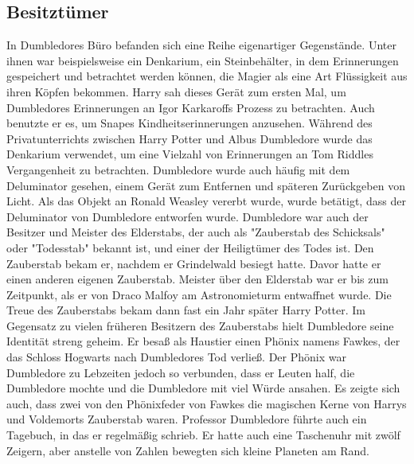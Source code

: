 \documentclass[a4paper, 10pt]{article}
\begin{document}
\subsection*{\Large Besitztümer}
In Dumbledores Büro befanden sich eine Reihe eigenartiger Gegenstände. Unter ihnen war beispielsweise ein Denkarium, ein Steinbehälter, in dem Erinnerungen gespeichert und betrachtet werden können, die Magier als eine Art Flüssigkeit aus ihren Köpfen bekommen. Harry sah dieses Gerät zum ersten Mal, um Dumbledores Erinnerungen an Igor Karkaroffs Prozess zu betrachten. Auch benutzte er es, um Snapes Kindheitserinnerungen anzusehen. Während des Privatunterrichts zwischen Harry Potter und Albus Dumbledore wurde das Denkarium verwendet, um eine Vielzahl von Erinnerungen an Tom Riddles Vergangenheit zu betrachten.
\vspace{10pt}
\newline
Dumbledore wurde auch häufig mit dem Deluminator gesehen, einem Gerät zum Entfernen und späteren Zurückgeben von Licht. Als das Objekt an Ronald Weasley vererbt wurde, wurde betätigt, dass der Deluminator von Dumbledore entworfen wurde. Dumbledore war auch der Besitzer und Meister des Elderstabs, der auch als "Zauberstab des Schicksals" oder "Todesstab" bekannt ist, und einer der Heiligtümer des Todes ist. Den Zauberstab bekam er, nachdem er Grindelwald besiegt hatte. Davor hatte er einen anderen eigenen Zauberstab. Meister über den Elderstab war er bis zum Zeitpunkt, als er von Draco Malfoy am Astronomieturm entwaffnet wurde. Die Treue des Zauberstabs bekam dann fast ein Jahr später Harry Potter. Im Gegensatz zu vielen früheren Besitzern des Zauberstabs hielt Dumbledore seine Identität streng geheim.
\vspace{10pt}
\newline
Er besaß als Haustier einen Phönix namens Fawkes, der das Schloss Hogwarts nach Dumbledores Tod verließ. Der Phönix war Dumbledore zu Lebzeiten jedoch so verbunden, dass er Leuten half, die Dumbledore mochte und die Dumbledore mit viel Würde ansahen. Es zeigte sich auch, dass zwei von den Phönixfeder von Fawkes die magischen Kerne von Harrys und Voldemorts Zauberstab waren.
\vspace{10pt}
\newline
Professor Dumbledore führte auch ein Tagebuch, in das er regelmäßig schrieb. Er hatte auch eine Taschenuhr mit zwölf Zeigern, aber anstelle von Zahlen bewegten sich kleine Planeten am Rand.
\end{document}
